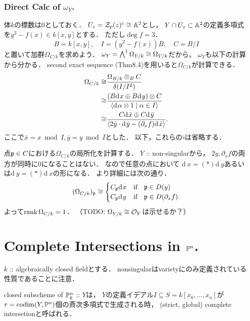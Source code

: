\documentclass[a4paper]{jsarticle}
\newcommand{\der}[1][\!]{\mathrm{d}_{#1}\,}
\newcommand{\Der}{\Omega}
\newcommand{\shCano}{\omega}
\begin{document}
    \subsubsection{Direct Calc of $\shCano_Y$.}
    体$k$の標数は$0$としておく．
    $U_z=\mathcal{Z}_p(z)^c \cong \mathbb{A}^2$とし，
    $Y \cap U_z \subset \mathbb{A}^2$の定義多項式を$y^2-f(x) \in k[x,y]$とする．
    ただし$\deg f=3$．
    \[ B=k[x,y], \quad I=(y^2-f(x))B, \quad C=B/I \]
    と置いて加群$\Der_{C/k}$を求めよう．
    $\shCano_Y=\bigwedge^1 \Der_{Y/k} \iso \Der_{Y/k}$だから，
    $\shCano_Y$も以下の計算から分かる．
    second exact sequence (Thm8.4)を用いると$\Der_{C/k}$が計算できる．
    \begin{align*}
                \Der_{C/k}
        \iso&   \frac{\Der_{B/k} \otimes_B C}{\delta(I/I^2)} \\
        \iso&   \frac{(B \der x \oplus B \der y) \otimes C}
                {\langle \der \alpha \otimes 1 \mid \alpha \in I \rangle} \\
        \iso&   \frac{C \der \bar{x} \oplus C \der \bar{y}}
                {\langle 2 \bar{y} \cdot \der \bar{y} -(\partial_x f) \der \bar{x} \rangle}.
    \end{align*}
    ここで$\bar{x}=x \bmod I, \bar{y}=y \bmod I$とした．
    以下，これらの$\bar{\square}$は省略する．
    
    点$\mathfrak{p} \in C$における$\Der_{C/k}$の局所化を計算する．
    $Y$ :: non-singularから，
    $2y, \partial_x f$の両方が同時に$0$になることはない．
    なので任意の点において
    $\der x=(*) \der y$あるいは$\der y=(*) \der x$の形になる．
    より詳細には次の通り．
    \[
        (\Der_{C/k})_{\I{p}} \iso
        \begin{cases}{}
            C_{\I{p}} \der x & \text{if} \quad \I{p} \in D(y) \\
            C_{\I{p}} \der y & \text{if} \quad \I{p} \in D(\partial_x f). \\
        \end{cases}
    \]
    よって$\rank \Der_{C/k}=1$．
    （TODO: $\Der_{Y/k} \iso \shO_Y$は示せるか？）

\section{Complete Intersections in $\mathbb{P}^n$.} %
    $k$ :: algebraically closed fieldとする．
    nonsingularはvarietyにのみ定義されている性質であることに注意．

    \begin{Def}
        closed subscheme of $\mathbb{P}^n_k$ :: $Y$は，
        $Y$の定義イデアル$I \subseteq S=k[x_0,\dots,x_n]$が
        $r=\operatorname{codim} (Y, \mathbb{P}^n)$個の斉次多項式で生成される時，
        (strict, global) complete intersetionと呼ばれる．
    \end{Def}
\end{document}
